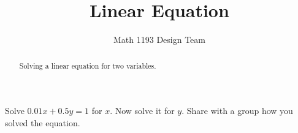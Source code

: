 \documentclass[noauthor]{ximera}
\title{Linear Equation}
\author{Math 1193 Design Team}
\begin{document}
\begin{abstract}
    Solving a linear equation for two variables.
\end{abstract}
\maketitle

Solve \(0.01x + 0.5y = 1\) for \(x\). Now solve it for \(y\).
Share with a group how you solved the equation.
\end{document}
